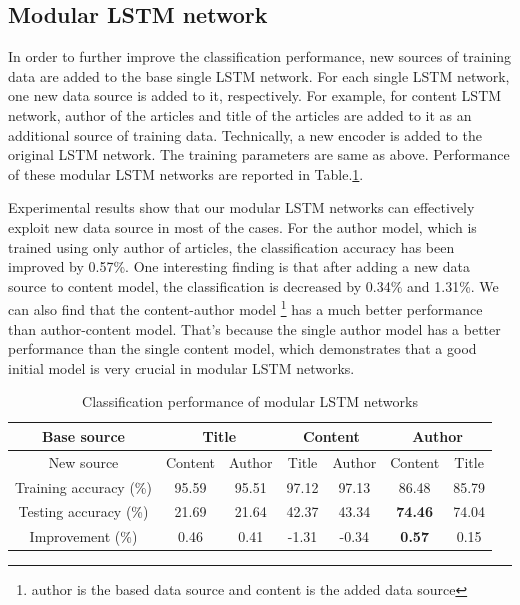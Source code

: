 \documentclass[12pt]{article}
\begin{document}
\subsection{Modular LSTM network}

In order to further improve the classification performance, new sources of training data are added to the base single LSTM network. For each single LSTM network, one new data source is added to it, respectively. For example, for content LSTM network, author of the articles and title of the articles are added to it as an additional source of training data. Technically, a new encoder is added to the original LSTM network. The training parameters are same as above. Performance of these modular LSTM networks are reported in Table.\ref{modular_lstm_acc}.

Experimental results show that our modular LSTM networks can effectively exploit new data source in most of the cases. For the author model, which is trained using only author of articles, the classification accuracy has been improved by 0.57\%. One interesting finding is that after adding a new data source to content model, the classification is decreased by 0.34\% and 1.31\%. We can also find that the content-author model \footnote{author is the based data source and content is the added data source} has a much better performance than author-content model. That's because the single author model has a better performance than the single content model, which demonstrates that a good initial model is very crucial in modular LSTM networks.


\begin{table}[!t]
\begin{center}
\caption{Classification performance of modular LSTM networks}
\label{modular_lstm_acc}
\begin{tabular}{c|cc|cc|cc}
\hline

Base source & \multicolumn{2}{c}{Title} & \multicolumn{2}{c}{Content} & \multicolumn{2}{c}{Author} \\
\hline
New source   &   Content   &   Author     &       Title  & Author                &            Content & Title \\
\hline
Training accuracy (\%)   & 95.59  &   95.51    &   97.12   &   97.13    &  86.48  & 85.79\\
Testing accuracy (\%)   &  21.69  &     21.64   &   42.37  &    43.34   &  \textbf{74.46}    & 74.04\\
\hline
Improvement (\%) &           0.46 &     0.41     &      -1.31    &    -0.34  &   \textbf{0.57}   & 0.15 \\

\hline

\hline
\end{tabular}
\end{center}
\end{table}
   
\end{document}
